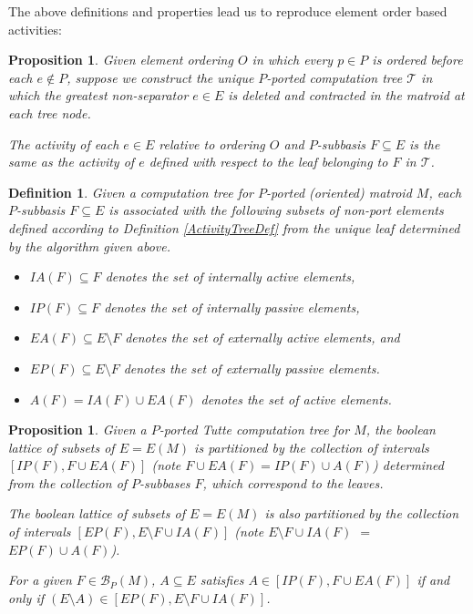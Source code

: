 \documentclass[12pt,leqno]{amsart}
\newtheorem{prop}[lem]{Proposition}
\newtheorem{definition}[lem]{Definition}
\theoremstyle{remark}
\begin{document}
The above definitions and properties lead us to 
reproduce element order based activities:
\begin{prop}
Given element ordering $O$ in which every $p\in P$ is ordered
before each $e\not\in P$, suppose we construct the unique $P$-ported
computation tree $\mathcal{T}$ in which the greatest non-separator $e\in E$ is
deleted and contracted in the matroid at each tree node.

The activity of each $e\in E$ relative to ordering $O$ and
$P$-subbasis $F\subseteq E$ is the same as the activity
of $e$ defined with respect to the leaf 
belonging to $F$ in $\mathcal{T}$.
\end{prop}

\begin{definition}
\label{ActivitySymbolsDef}
Given a computation tree for 
$P$-ported (oriented) matroid $M$,
each $P$-subbasis $F\subseteq E$
is associated with the following subsets of non-port elements
defined according to Definition \ref{ActivityTreeDef}
from the unique leaf determined by the algorithm given above.
\begin{itemize}
\item $IA(F)\subseteq F$ denotes the set of internally active elements,
\item $IP(F)\subseteq F$ denotes the set of internally passive elements,
\item $EA(F)\subseteq E\setminus F$ 
denotes the set of externally active elements,
and 
\item $EP(F)\subseteq E\setminus F$ denotes the set of externally
passive elements.
\item $A(F)=IA(F)\cup EA(F)$ denotes the set of active elements.
\end{itemize}
\end{definition}

\begin{prop}
\label{PartitionProposition}
Given a $P$-ported Tutte computation tree for
$M$, 
the boolean lattice of subsets of $E=E(M)$
is partitioned by the collection of
intervals $[IP(F),F\cup EA(F)]$ (note $F\cup EA(F)=IP(F)\cup A(F)$)
determined from the collection
of $P$-subbases $F$, which correspond to the leaves.

The boolean lattice of subsets of $E=E(M)$
is also partitioned by the collection of
intervals $[EP(F),E\setminus F\cup IA(F)]$ 
(note $E\setminus F\cup IA(F)$ $=$ $EP(F)\cup A(F)$).

For a given $F\in\mathcal{B}_P(M)$, $A\subseteq E$ satisfies
$A\in [IP(F),F\cup EA(F)]$ if and only if 
$(E\setminus A)\in [EP(F),E\setminus F\cup IA(F)]$. 
\end{prop}
\end{document}
